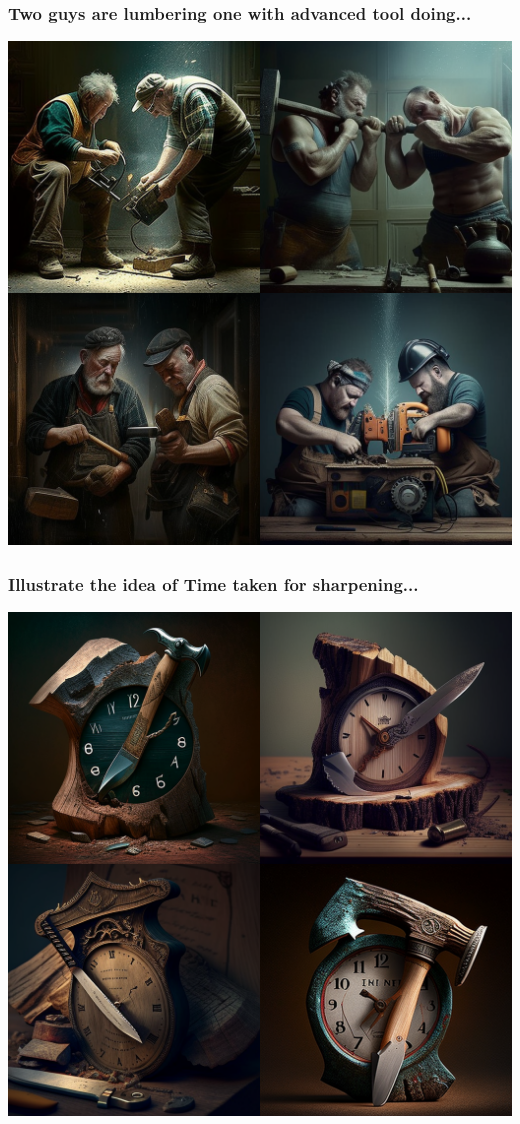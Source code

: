 \documentclass[9pt,table,xcolor=dvipsnames]{beamer}%
\theoremstyle{definition}
\theoremstyle{plain}
\begin{document}
\begin{frame}[fragile,t] %
  \frametitle{Two guys are lumbering one with advanced tool doing...}
  \begin{center}
    \includegraphics[scale=0.22]{./figs/chenle02_two_guys_are_Lumbering_one_with_advanced_tool_doing_th.png}
  \end{center}
\end{frame}
\begin{frame}[fragile,t] %
  \frametitle{Illustrate the idea of Time taken for sharpening...}
  \begin{center}
    \includegraphics[scale=0.22]{./figs/chenle02_Illustrate_the_idea_of_Time_taken_for_sharpening_the_a.png}
  \end{center}
\end{frame}
\end{document}
